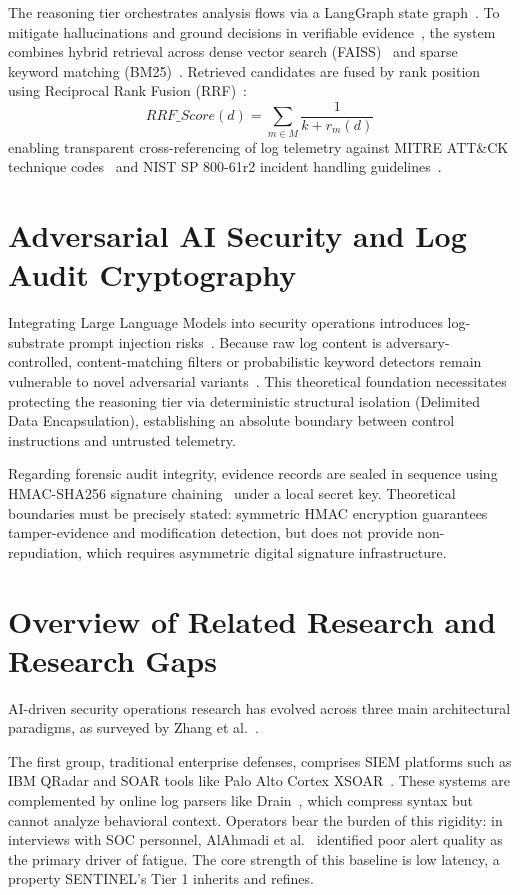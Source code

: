 The reasoning tier orchestrates analysis flows via a LangGraph state graph~\cite{langgraph2024}. To mitigate hallucinations and ground decisions in verifiable evidence~\cite{rag2020}, the system combines hybrid retrieval across dense vector search (FAISS)~\cite{faiss2019} and sparse keyword matching (BM25)~\cite{bm25_2009}. Retrieved candidates are fused by rank position using Reciprocal Rank Fusion (RRF)~\cite{rrf2009}:
\begin{equation}
\label{eq:rrf}
    RRF\_Score(d) = \sum_{m \in M} \frac{1}{k + r_m(d)}
\end{equation}
enabling transparent cross-referencing of log telemetry against MITRE ATT\&CK technique codes~\cite{strom2018mitre} and NIST SP 800-61r2 incident handling guidelines~\cite{nist80061}.

\section{Adversarial AI Security and Log Audit Cryptography}
\label{sec:adversarial_theory}

Integrating Large Language Models into security operations introduces log-substrate prompt injection risks~\cite{promptinjection2023, owasp_llm2025}. Because raw log content is adversary-controlled, content-matching filters or probabilistic keyword detectors remain vulnerable to novel adversarial variants~\cite{watchtower2026}. This theoretical foundation necessitates protecting the reasoning tier via deterministic structural isolation (Delimited Data Encapsulation), establishing an absolute boundary between control instructions and untrusted telemetry.

Regarding forensic audit integrity, evidence records are sealed in sequence using HMAC-SHA256 signature chaining~\cite{hmac1997} under a local secret key. Theoretical boundaries must be precisely stated: symmetric HMAC encryption guarantees tamper-evidence and modification detection, but does not provide non-repudiation, which requires asymmetric digital signature infrastructure.

\section{Overview of Related Research and Research Gaps}

AI-driven security operations research has evolved across three main architectural paradigms, as surveyed by Zhang et al.~\cite{llmsec_survey2025}.

The first group, traditional enterprise defenses, comprises SIEM platforms such as IBM QRadar and SOAR tools like Palo Alto Cortex XSOAR~\cite{siem2021, soar2025}. These systems are complemented by online log parsers like Drain~\cite{he2017drain}, which compress syntax but cannot analyze behavioral context. Operators bear the burden of this rigidity: in interviews with SOC personnel, AlAhmadi et al.~\cite{alahmadi2022} identified poor alert quality as the primary driver of fatigue. The core strength of this baseline is low latency, a property SENTINEL's Tier 1 inherits and refines.

